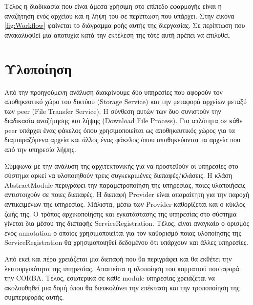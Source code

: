 Τέλος η διαδικασία που είναι άμεσα χρήσιμη στο επίπεδο εφαρμογής 
είναι η αναζήτηση ενός αρχείου και η λήψη του σε περίπτωση που υπάρχει. 
Στην εικόνα \ref{fig:Workflow} φαίνεται το διάγραμμα ροής αυτής της 
διεργασίας. Σε περίπτωση που ανακαλυφθεί μια αποτυχία κατά την εκτέλεση 
της τότε αυτή πρέπει να επιλυθεί.

\section{Υλοποίηση}

Από την προηγούμενη ανάλυση διακρίνουμε δύο υπηρεσίες που αφορούν τον 
αποθηκευτικό χώρο του δικτύου (Storage Service) και την μεταφορά αρχείων 
μεταξύ των peer (File Transfer Service). Η σύνθεση αυτών των δυο 
συνιστούν την διαδικασία αναζήτησης και λήψης (Download File Process). 
Για απλότητα σε κάθε peer υπάρχει ένας φάκελος όπου χρησιμοποιείται ως 
αποθηκευτικός χώρος για τα διαμοιραζόμενα αρχεία και άλλος ένας φάκελος 
όπου αποθηκεύονται τα αρχεία που από την υπηρεσία λήψης.

Σύμφωνα με την ανάλυση της αρχιτεκτονικής για να προστεθούν οι υπηρεσίες 
στο σύστημα αρκεί να υλοποιηθούν τρεις συγκεκριμένες διεπαφές/κλάσεις. Η 
κλάση AbstractModule περιγράφει την παραμετροποίηση της υπηρεσίας, ποιες 
υλοποιήσεις αντιστοιχούν σε ποιες διεπαφές. Η διεπαφή Provider είναι 
απαραίτητη για την παροχή αντικειμένων της υπηρεσίας. Μάλιστα, μέσω των 
Provider καθορίζεται και ο κύκλος ζωής της. Ο τρόπος αρχικοποίησης και 
εγκατάστασης της υπηρεσίας στο σύστημα γίνεται δια μέσου της διεπαφής 
ServiceRegistration. Τέλος, είναι αναγκαίο ο ορισμός ενός annotation ο 
οποίος χρησιμοποιείται για τον καθορισμό ποιας υλοποίησης της 
ServiceRegistration θα χρησιμοποιηθεί δεδομένου ότι υπάρχουν και άλλες 
υπηρεσίες.

Από εκεί και πέρα χρειάζεται μια διεπαφή που θα περιγράφει και θα 
εκθέτει την λειτουργικότητα της υπηρεσίας. Απαιτείται η υλοποίηση του 
κομματιού που αφορά την CORBA. Τέλος, εσωτερικά σε κάθε module υπηρεσίας 
χρειάζεται να ακολουθηθεί μια δομή όπου θα διευκολύνει την επέκταση και 
την τροποποίηση της συμπεριφοράς αυτής.


